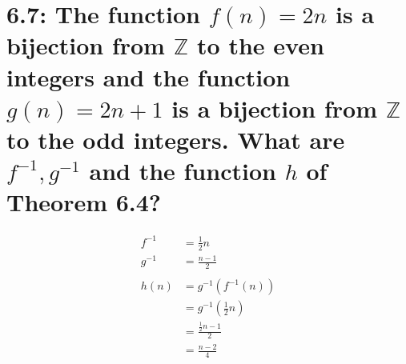\documentclass{article}
\begin{document}
\section*{6.7: The function $f(n) = 2n$ is a bijection from $\mathbb{Z}$ to the even integers and the function $g(n) = 2n + 1$ is a bijection from $\mathbb{Z}$ to the odd integers. What are $f^{-1}, g^{-1}$ and the function $h$ of Theorem 6.4?}
\begin{align*}
  f^{-1} &= \frac{1}{2}n \\
  g^{-1} &= \frac{n-1}{2} \\
  \\
  h(n) &= g^{-1}(f^{-1}(n)) \\
  &= g^{-1}(\frac{1}{2}n) \\
  &= \frac{\frac{1}{2}n - 1}{2} \\
  &= \frac{n-2}{4}
\end{align*}
\end{document}
